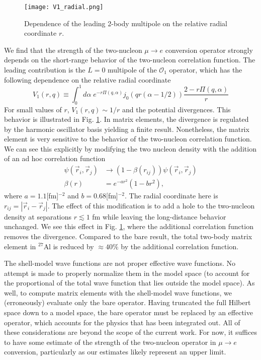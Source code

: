 \documentclass{book}[letterpaper,12pt]
\begin{document}
\begin{figure}
\centering
\texttt{[image: V1\_radial.png]}
\caption{Dependence of the leading 2-body multipole on the relative radial coordinate $r$.}
\label{fig:V1_radial}
\end{figure}

We find that the strength of the two-nucleon $\mu\rightarrow e$ conversion operator strongly depends on the short-range behavior of the two-nucleon correlation function. The leading contribution is the $L=0$ multipole of the $\mathcal{O}_1$ operator, which has the following dependence on the relative radial coordinate
\begin{equation}
V_1(r,q)\equiv \int_0^1d\alpha\;e^{-r\Pi(q,\alpha)}j_0(qr(\alpha-1/2))\frac{2-r\Pi(q,\alpha)}{r}
\end{equation}
For small values of $r$, $V_1(r,q)\sim 1/r$ and the potential divergences. This behavior is illustrated in Fig. \ref{fig:V1_radial}. In matrix elements, the divergence is regulated by the harmonic oscillator basis yielding a finite result. Nonetheless, the matrix element is very sensitive to the behavior of the two-nucleon correlation function. We can see this explicitly by modifying the two nucleon density with the addition of an ad hoc correlation function
\begin{equation}
\begin{split}
\psi(\vec{r}_i,\vec{r}_j)&\rightarrow\left(1-\beta(r_{ij})\right)\psi(\vec{r}_i,\vec{r}_j)\\
\beta(r)&=e^{-ar^2}\left(1-br^2\right),
\label{eq:f_corr}
\end{split}
\end{equation}
where $a=1.1$[fm]$^{-2}$ and $b=0.68$[fm]$^{-2}$. The radial coordinate here is $r_{ij}=|\vec{r}_i-\vec{r}_j|$. The effect of this modification is to add a hole to the two-nucleon density at separations $r\lesssim 1$ fm while leaving the long-distance behavior unchanged. We see this effect in Fig. \ref{fig:V1_radial}, where the additional correlation function removes the divergence. Compared to the bare result, the total two-body matrix element in $^{27}$Al is reduced by $\approx 40\%$ by the additional correlation function. 

The shell-model wave functions are not proper effective wave functions. No attempt is made to properly normalize them in the model space (to account for the proportional of the total wave function that lies outside the model space). As well, to compute matrix elements with the shell-model wave functions, we (erroneously) evaluate only the bare operator. Having truncated the full Hilbert space down to a model space, the bare operator must be replaced by an effective operator, which accounts for the physics that has been integrated out. All of these considerations are beyond the scope of the current work. For now, it suffices to have some estimate of the strength of the two-nucleon operator in $\mu\rightarrow e$ conversion, particularly as our estimates likely represent an upper limit.
\end{document}
